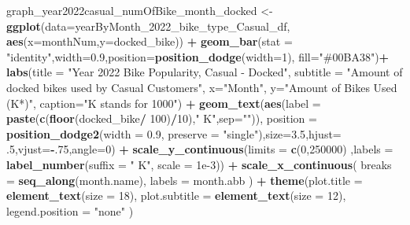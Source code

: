 \documentclass[
]{article}
\newenvironment{Shaded}{\begin{snugshade}}{\end{snugshade}}
\newcommand{\AttributeTok}[1]{\textcolor[rgb]{0.13,0.29,0.53}{#1}}
\newcommand{\DecValTok}[1]{\textcolor[rgb]{0.00,0.00,0.81}{#1}}
\newcommand{\FloatTok}[1]{\textcolor[rgb]{0.00,0.00,0.81}{#1}}
\newcommand{\FunctionTok}[1]{\textcolor[rgb]{0.13,0.29,0.53}{\textbf{#1}}}
\newcommand{\NormalTok}[1]{#1}
\newcommand{\OtherTok}[1]{\textcolor[rgb]{0.56,0.35,0.01}{#1}}
\newcommand{\SpecialCharTok}[1]{\textcolor[rgb]{0.81,0.36,0.00}{\textbf{#1}}}
\newcommand{\StringTok}[1]{\textcolor[rgb]{0.31,0.60,0.02}{#1}}
\begin{document}
\begin{Shaded}
\begin{Highlighting}[]
\NormalTok{graph\_year2022casual\_numOfBike\_month\_docked }\OtherTok{\textless{}{-}} \FunctionTok{ggplot}\NormalTok{(}\AttributeTok{data=}\NormalTok{yearByMonth\_2022\_bike\_type\_Casual\_df, }\FunctionTok{aes}\NormalTok{(}\AttributeTok{x=}\NormalTok{monthNum,}\AttributeTok{y=}\NormalTok{docked\_bike)) }\SpecialCharTok{+}
  \FunctionTok{geom\_bar}\NormalTok{(}\AttributeTok{stat =} \StringTok{"identity"}\NormalTok{,}\AttributeTok{width=}\FloatTok{0.9}\NormalTok{,}\AttributeTok{position=}\FunctionTok{position\_dodge}\NormalTok{(}\AttributeTok{width=}\DecValTok{1}\NormalTok{), }\AttributeTok{fill=}\StringTok{"\#00BA38"}\NormalTok{)}\SpecialCharTok{+}
  \FunctionTok{labs}\NormalTok{(}\AttributeTok{title =} \StringTok{"Year 2022 Bike Popularity, Casual {-} Docked"}\NormalTok{,}
       \AttributeTok{subtitle =} \StringTok{"Amount of docked bikes used by Casual Customers"}\NormalTok{,}
       \AttributeTok{x=}\StringTok{"Month"}\NormalTok{,}
       \AttributeTok{y=}\StringTok{"Amount of Bikes Used (K*)"}\NormalTok{,}
       \AttributeTok{caption=}\StringTok{"K stands for 1000"}\NormalTok{) }\SpecialCharTok{+}
  \FunctionTok{geom\_text}\NormalTok{(}\FunctionTok{aes}\NormalTok{(}\AttributeTok{label =} \FunctionTok{paste}\NormalTok{(}\FunctionTok{c}\NormalTok{(}\FunctionTok{floor}\NormalTok{(docked\_bike}\SpecialCharTok{/} \DecValTok{100}\NormalTok{)}\SpecialCharTok{/}\DecValTok{10}\NormalTok{),}\StringTok{" K"}\NormalTok{,}\AttributeTok{sep=}\StringTok{""}\NormalTok{)),}
            \AttributeTok{position =} \FunctionTok{position\_dodge2}\NormalTok{(}\AttributeTok{width =} \FloatTok{0.9}\NormalTok{, }\AttributeTok{preserve =} \StringTok{"single"}\NormalTok{),}\AttributeTok{size=}\FloatTok{3.5}\NormalTok{,}\AttributeTok{hjust=}\NormalTok{ .}\DecValTok{5}\NormalTok{,}\AttributeTok{vjust=}\SpecialCharTok{{-}}\NormalTok{.}\DecValTok{75}\NormalTok{,}\AttributeTok{angle=}\DecValTok{0}\NormalTok{) }\SpecialCharTok{+}
  \FunctionTok{scale\_y\_continuous}\NormalTok{(}\AttributeTok{limits =} \FunctionTok{c}\NormalTok{(}\DecValTok{0}\NormalTok{,}\DecValTok{250000}\NormalTok{) ,}\AttributeTok{labels =} \FunctionTok{label\_number}\NormalTok{(}\AttributeTok{suffix =} \StringTok{" K"}\NormalTok{, }\AttributeTok{scale =} \FloatTok{1e{-}3}\NormalTok{)) }\SpecialCharTok{+}
  \FunctionTok{scale\_x\_continuous}\NormalTok{(}
    \AttributeTok{breaks =} \FunctionTok{seq\_along}\NormalTok{(month.name), }
    \AttributeTok{labels =}\NormalTok{ month.abb}
\NormalTok{  ) }\SpecialCharTok{+}
  \FunctionTok{theme}\NormalTok{(}\AttributeTok{plot.title =} \FunctionTok{element\_text}\NormalTok{(}\AttributeTok{size =} \DecValTok{18}\NormalTok{),}
        \AttributeTok{plot.subtitle =} \FunctionTok{element\_text}\NormalTok{(}\AttributeTok{size =} \DecValTok{12}\NormalTok{),}
        \AttributeTok{legend.position =} \StringTok{"none"}
\NormalTok{  ) }



\end{Highlighting}
\end{Shaded}
\end{document}
